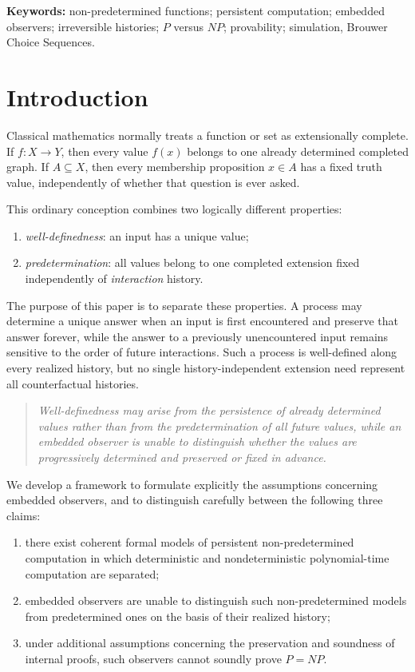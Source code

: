 \documentclass[11pt]{article}
\begin{document}
\noindent\textbf{Keywords:} non-predetermined functions; persistent computation; embedded
observers; irreversible histories; \(P\) versus \(NP\); provability; simulation,  Brouwer Choice Sequences.

\medskip

\section{Introduction}

Classical mathematics normally treats a function or set as extensionally complete.  If
\(f:X\to Y\), then every value \(f(x)\) belongs to one already determined completed graph.  If
\(A\subseteq X\), then every membership proposition \(x\in A\) has a fixed truth value,
independently of whether that question is ever asked.

This ordinary conception combines two logically different properties:
\begin{enumerate}[label=(\roman*)]
  \item \emph{well-definedness}: an input has a unique value;
  \item \emph{predetermination}: all values belong to one completed extension fixed
  independently of \textit{interaction} history.
\end{enumerate}

The purpose of this paper is to separate these properties.  A process may determine a unique
answer when an input is first encountered and preserve that answer forever, while the answer
to a previously unencountered input remains sensitive to the order of future interactions.
Such a process is well-defined along every realized history, but no single
history-independent extension need represent all counterfactual histories.

\begin{quote}
 \textit{Well-definedness may arise from the persistence of already determined values rather than from the predetermination of all future values, while an embedded observer is unable to distinguish whether the values are progressively determined and preserved or fixed in advance.
}
\end{quote}

We develop a framework to formulate explicitly the assumptions concerning embedded observers, and to distinguish carefully between the following three claims:
\begin{enumerate}[label=(\arabic*)]
  \item there exist coherent formal models of persistent non-predetermined computation in which deterministic and nondeterministic polynomial-time computation are separated;
  \item embedded observers are unable to distinguish such non-predetermined models from predetermined ones on the basis of their realized history;
  \item under additional assumptions concerning the preservation and soundness of internal proofs, such observers cannot soundly prove
  \(P=NP\).
\end{enumerate}
\end{document}
